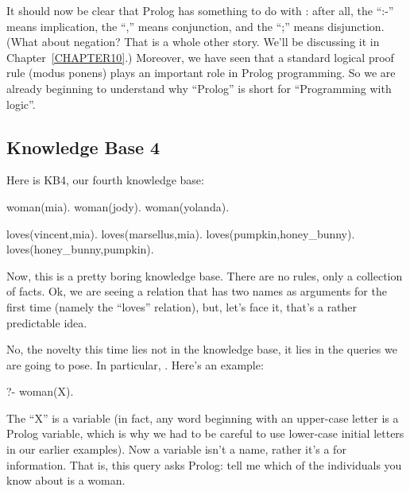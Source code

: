It should now be clear that Prolog has something to do with
: after all, the ``:-'' means implication, the ``,'' means
conjunction, and the ``;'' means disjunction.  (What about negation?
That is a whole other story. We'll be discussing it in
Chapter~\ref{CHAPTER10}.)  Moreover, we have seen that a standard
logical proof rule (modus ponens) plays an important role in Prolog
programming.  So we are already beginning to understand why ``Prolog''
is short for ``Programming with logic''.



\subsection*{Knowledge Base 4}\label{SUBSEC.L1.KB4}

Here is KB4, our fourth knowledge base:

\begin{LPNcodedisplay}
woman(mia).
woman(jody).
woman(yolanda).

loves(vincent,mia).
loves(marsellus,mia).
loves(pumpkin,honey_bunny).
loves(honey_bunny,pumpkin).
\end{LPNcodedisplay}


Now, this is a pretty boring knowledge base. There are no rules, only
a collection of facts. Ok, we are seeing a relation that has two names
as arguments for the first time (namely the ``loves'' relation), but,
let's face it, that's a rather predictable idea.

No, the novelty this time lies not in the knowledge base, it lies in
the queries we are going to pose. In particular, .  Here's an
example:
\begin{LPNcodedisplay}
?- woman(X).
\end{LPNcodedisplay}

The ``X'' is a variable (in fact, any word beginning with an upper-case
letter is a Prolog variable, which is why we had to be careful to use
lower-case initial letters in our earlier examples).  Now a variable
isn't a name, rather it's a  for
information. That is, this query asks Prolog: tell me which of the
individuals you know about is a woman.

